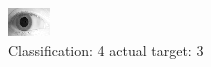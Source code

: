 \begin{figure}[h!]
\begin{center}
\includegraphics[width=0.60\columnwidth]{figures/ID1941_class_4_target_3.png}
\end{center}
\caption{ Classification: 4 actual target: 3}
\label{fig:ID1941_class_4_target_3}
\end{figure}
